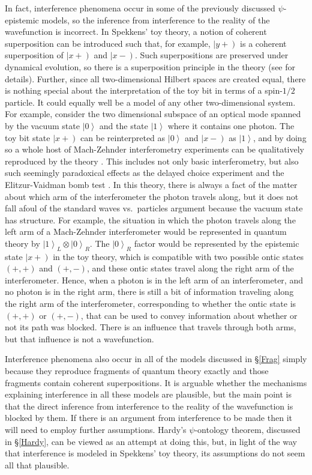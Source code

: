 \documentclass[DIV=calc,paper=a4,fontsize=11pt,twocolumn]{scrartcl} %
\theoremstyle{definition}
\theoremstyle{plain}
\newcommand{\RKet}[1]{\ensuremath{\left \vert #1 \right )}}
\newcommand{\Ket}[1]{\ensuremath{\left \vert #1 \right \rangle}}
\begin{document}
In fact, interference phenomena occur in some of the previously
discussed $\psi$-epistemic models, so the inference from interference
to the reality of the wavefunction is incorrect.  In Spekkens' toy
theory, a notion of coherent superposition can be introduced such
that, for example, $\RKet{y+}$ is a coherent superposition of
$\RKet{x+}$ and $\RKet{x-}$.  Such superpositions are preserved under
dynamical evolution, so there is a superposition principle in the
theory (see \cite{Spekkens2007} for details).  Further, since all
two-dimensional Hilbert spaces are created equal, there is nothing
special about the interpretation of the toy bit in terms of a
spin-$1/2$ particle.  It could equally well be a model of any other
two-dimensional system.  For example, consider the two dimensional
subspace of an optical mode spanned by the vacuum state $\Ket{0}$ and
the state $\Ket{1}$ where it contains one photon.  The toy bit state
$\RKet{x+}$ can be reinterpreted as $\Ket{0}$ and $\RKet{x-}$ as
$\Ket{1}$, and by doing so a whole host of Mach-Zehnder interferometry
experiments can be qualitatively reproduced by the theory
\cite{Martin2014}.  This includes not only basic interferometry, but
also such seemingly paradoxical effects as the delayed choice
experiment \cite{Wheeler1978} and the Elitzur-Vaidman bomb test
\cite{Elitzur1993}.  In this theory, there is always a fact of the
matter about which arm of the interferometer the photon travels along,
but it does not fall afoul of the standard waves vs.\ particles
argument because the vacuum state has structure.  For example, the
situation in which the photon travels along the left arm of a
Mach-Zehnder interferometer would be represented in quantum theory by
$\Ket{1}_L \otimes \Ket{0}_R$.  The $\Ket{0}_R$ factor would be
represented by the epistemic state $\RKet{x+}$ in the toy theory,
which is compatible with two possible ontic states $(+,+)$ and
$(+,-)$, and these ontic states travel along the right arm of the
interferometer.  Hence, when a photon is in the left arm of an
interferometer, and no photon is in the right arm, there is still a
bit of information traveling along the right arm of the
interferometer, corresponding to whether the ontic state is $(+,+)$ or
$(+,-)$, that can be used to convey information about whether or not
its path was blocked.  There is an influence that travels through both
arms, but that influence is not a wavefunction.

Interference phenomena also occur in all of the models discussed in
\S\ref{Frag} simply because they reproduce fragments of quantum theory
exactly and those fragments contain coherent superpositions.  It is
arguable whether the mechanisms explaining interference in all these
models are plausible, but the main point is that the direct inference
from interference to the reality of the wavefunction is blocked by
them.  If there is an argument from interference to be made then it
will need to employ further assumptions.  Hardy's $\psi$-ontology
theorem, discussed in \S\ref{Hardy}, can be viewed as an attempt at
doing this, but, in light of the way that interference is modeled in
Spekkens' toy theory, its assumptions do not seem all that plausible.
\end{document}

